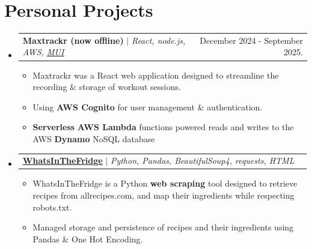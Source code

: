 \documentclass[letterpaper,11pt]{article}
\makeatletter
\newcommand{\resumeItem}[1]{
  \item\small{
    {#1 \vspace{-2pt}}
  }
}
\newcommand{\resumeProjectHeading}[2]{
    \item
    \begin{tabular*}{0.97\textwidth}{l@{\extracolsep{\fill}}r}
      \small#1 & #2 \\
    \end{tabular*}\vspace{-7pt}
}
\newcommand{\resumeSubHeadingListStart}{\begin{itemize}[leftmargin=0.15in, label={}]}
\newcommand{\resumeSubHeadingListEnd}{\end{itemize}}
\newcommand{\resumeItemListStart}{\begin{itemize}\vspace{0pt}}
\newcommand{\resumeItemListEnd}{\end{itemize}\vspace{0pt}}
\makeatother
\begin{document}
\section{Personal Projects}
    \resumeSubHeadingListStart
      \resumeProjectHeading
        {\textbf{Maxtrackr (now offline)}{\vspace{5pt}} $|$ \emph{React, node.js, AWS, \underline{\href{https://mui.com/}{MUI}}}}{December 2024 - September 2025.}
          \resumeItemListStart
              \resumeItem{Maxtrackr was a React web application designed to streamline the recording \& storage of workout sessions.}
              \resumeItem{Using \textbf{AWS Cognito} for user management \& authentication.}
              \resumeItem{\textbf{Serverless} \textbf{AWS Lambda} functions powered reads and writes to the AWS \textbf{Dynamo} NoSQL database}
          \resumeItemListEnd    
      \resumeProjectHeading 
        {\textbf{\href{https://github.com/g-n-b/WhatsInTheFridge}{\underline{WhatsInTheFridge}}{\vspace{5pt}}} $|$ \emph{Python, Pandas, BeautifulSoup4, requests, HTML}}{}
          \resumeItemListStart
            \resumeItem{WhatsInTheFridge is a Python \textbf{web scraping} tool designed to retrieve recipes from allrecipes.com, and map their ingredients while respecting robots.txt.}
            \resumeItem{Managed storage and persistence of recipes and their ingredients using Pandas \& One Hot Encoding.}
          \resumeItemListEnd
    \resumeSubHeadingListEnd
\end{document}
